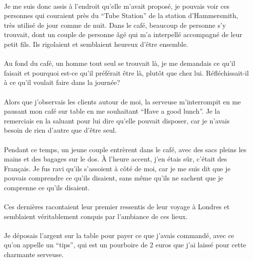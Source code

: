 \paragraph{} Je me suis donc assis à l'endroit qu'elle m'avait proposé, je
pouvais voir ces personnes qui couraient près du ``Tube Station'' de la station
d'Hammersmith, très utilisé de jour comme de nuit. Dans le café, beaucoup de
personne s'y trouvait, dont un couple de personne âgé qui m'a interpellé
accompagné de leur petit fils. Ils rigolaient et semblaient heureux d'être
ensemble.

\paragraph{} Au fond du café, un homme tout seul se trouvait là, je me
demandais ce qu'il faisait et pourquoi est-ce qu'il préférait être là, plutôt
que chez lui.  Réfléchissait-il à ce qu'il voulait faire dans la journée?

\paragraph{} Alors que j'observais les clients autour de moi, la serveuse
m'interrompit en me pausant mon café sur table en me souhaitant ``Have a good
lunch''.  Je la remerciais en la saluant pour lui dire qu'elle pouvait
disposer, car je n'avais besoin de rien d'autre que d'être seul.

\paragraph{} Pendant ce temps, un jeune couple entrèrent dans le café, avec des
sacs pleins les mains et des bagages sur le dos. À l'heure accent, j'en étais
sûr, c'était des Français. Je fus ravi qu'ils s'assoient à côté de moi, car je
me suis dit que je pouvais comprendre ce qu'ils disaient, sans même qu'ils ne
sachent que je comprenne ce qu'ils disaient.

\paragraph{} Ces dernières racontaient leur premier ressentis de leur voyage à
Londres et semblaient véritablement conquis par l'ambiance de ces lieux.

\paragraph{} Je déposais l'argent sur la table pour payer ce que j'avais
commandé, avec ce qu'on appelle un ``tips'', qui est un pourboire de 2 euros
que j'ai laissé pour cette charmante serveuse.

